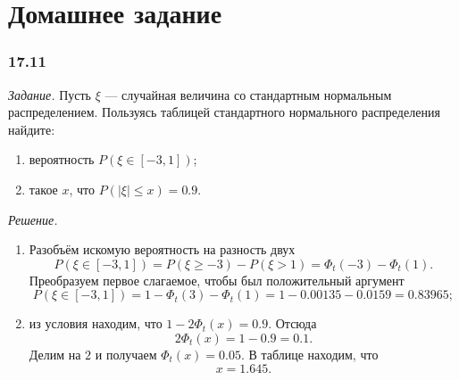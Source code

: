 \section*{Домашнее задание}

\subsubsection*{17.11}

\textit{Задание.} Пусть $ \xi $ --- случайная величина со стандартным нормальным распределением.
Пользуясь таблицей стандартного нормального распределения найдите:
\begin{enumerate}[label=\alph*)]
\item вероятность $P \left( \xi \in \left[ -3, 1 \right] \right) $;
\item такое $x$, что $P \left( \left| \xi \right| \leq x \right) = 0.9$.
\end{enumerate}

\textit{Решение.}
\begin{enumerate}[label=\alph*)]
\item Разобъём искомую вероятность на разность двух
$$P \left( \xi \in \left[ -3, 1 \right] \right) =
  P \left( \xi \geq -3 \right) - P \left( \xi > 1 \right) =
  \Phi_t \left( -3 \right) - \Phi_t \left( 1 \right).$$
Преобразуем первое слагаемое, чтобы был положительный аргумент
$$P \left( \xi \in \left[ -3, 1 \right] \right) =
  1 - \Phi_t \left( 3 \right) - \Phi_t \left( 1 \right) =
  1 - 0.00135 - 0.0159 =
  0.83965;$$
\item из условия находим, что $1 - 2 \Phi_t \left( x \right) = 0.9$.
Отсюда
$$2 \Phi_t \left( x \right) =
  1 - 0.9 =
  0.1.$$
Делим на $2$ и получаем $ \Phi_t \left( x \right) = 0.05$.
В таблице находим, что
$$x =
  1.645.$$
\end{enumerate}
